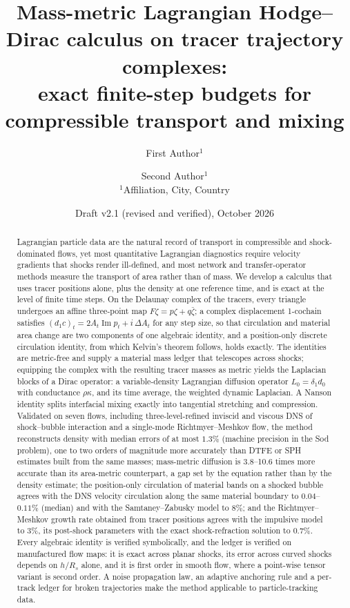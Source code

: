 \documentclass[11pt]{article}
\title{Mass-metric Lagrangian Hodge--Dirac calculus on tracer trajectory complexes:\\ exact finite-step budgets for compressible transport and mixing}
\author{First Author$^{1}$ \and Second Author$^{1}$\\[0.3em]{\small $^1$Affiliation, City, Country}}
\date{Draft v2.1 (revised and verified), October 2026}
\theoremstyle{definition}\newtheorem{definition}{Definition}\theoremstyle{remark}\newtheorem{remark}{Remark}
\newcommand{\im}{\operatorname{Im}}\newcommand{\re}{\operatorname{Re}}
\begin{document}
\maketitle

\begin{abstract}
Lagrangian particle data are the natural record of transport in compressible and shock-dominated flows, yet most quantitative Lagrangian diagnostics require velocity gradients that shocks render ill-defined, and most network and transfer-operator methods measure the transport of area rather than of mass. We develop a calculus that uses tracer positions alone, plus the density at one reference time, and is exact at the level of finite time steps. On the Delaunay complex of the tracers, every triangle undergoes an affine three-point map $F\zeta=p\zeta+q\bar\zeta$; a complex displacement 1-cochain satisfies $(d_1c)_t=2A_t\im p_t+i\,\Delta A_t$ for any step size, so that circulation and material area change are two components of one algebraic identity, and a position-only discrete circulation identity, from which Kelvin's theorem follows, holds exactly. The identities are metric-free and supply a material mass ledger that telescopes across shocks; equipping the complex with the resulting tracer masses as metric yields the Laplacian blocks of a Dirac operator: a variable-density Lagrangian diffusion operator $L_0=\delta_1d_0$ with conductance $\rho\kappa$, and its time average, the weighted dynamic Laplacian. A Nanson identity splits interfacial mixing exactly into tangential stretching and compression. Validated on seven flows, including three-level-refined inviscid and viscous DNS of shock--bubble interaction and a single-mode Richtmyer--Meshkov flow, the method reconstructs density with median errors of at most $1.3\%$ (machine precision in the Sod problem), one to two orders of magnitude more accurately than DTFE or SPH estimates built from the same masses; mass-metric diffusion is 3.8--10.6 times more accurate than its area-metric counterpart, a gap set by the equation rather than by the density estimate; the position-only circulation of material bands on a shocked bubble agrees with the DNS velocity circulation along the same material boundary to $0.04$--$0.11\%$ (median) and with the Samtaney--Zabusky model to $8\%$; and the Richtmyer--Meshkov growth rate obtained from tracer positions agrees with the impulsive model to $3\%$, its post-shock parameters with the exact shock-refraction solution to $0.7\%$. Every algebraic identity is verified symbolically, and the ledger is verified on manufactured flow maps: it is exact across planar shocks, its error across curved shocks depends on $h/R_s$ alone, and it is first order in smooth flow, where a point-wise tensor variant is second order. A noise propagation law, an adaptive anchoring rule and a per-track ledger for broken trajectories make the method applicable to particle-tracking data.
\end{abstract}
\end{document}
